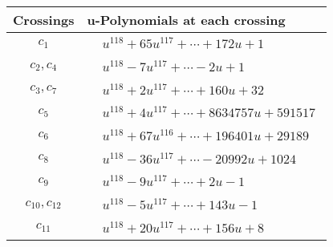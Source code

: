 \documentclass[1p]{elsarticle_modified}
\theoremstyle{definition}
\begin{document}
\begin{tabular}{m{50pt}|m{274pt}}
Crossings & \hspace{64pt}u-Polynomials at each crossing \\
\hline $$\begin{aligned}c_{1}\end{aligned}$$&$\begin{aligned}
&u^{118}+65 u^{117}+\cdots+172 u+1
\end{aligned}$\\
\hline $$\begin{aligned}c_{2},c_{4}\end{aligned}$$&$\begin{aligned}
&u^{118}-7 u^{117}+\cdots-2 u+1
\end{aligned}$\\
\hline $$\begin{aligned}c_{3},c_{7}\end{aligned}$$&$\begin{aligned}
&u^{118}+2 u^{117}+\cdots+160 u+32
\end{aligned}$\\
\hline $$\begin{aligned}c_{5}\end{aligned}$$&$\begin{aligned}
&u^{118}+4 u^{117}+\cdots+8634757 u+591517
\end{aligned}$\\
\hline $$\begin{aligned}c_{6}\end{aligned}$$&$\begin{aligned}
&u^{118}+67 u^{116}+\cdots+196401 u+29189
\end{aligned}$\\
\hline $$\begin{aligned}c_{8}\end{aligned}$$&$\begin{aligned}
&u^{118}-36 u^{117}+\cdots-20992 u+1024
\end{aligned}$\\
\hline $$\begin{aligned}c_{9}\end{aligned}$$&$\begin{aligned}
&u^{118}-9 u^{117}+\cdots+2 u-1
\end{aligned}$\\
\hline $$\begin{aligned}c_{10},c_{12}\end{aligned}$$&$\begin{aligned}
&u^{118}-5 u^{117}+\cdots+143 u-1
\end{aligned}$\\
\hline $$\begin{aligned}c_{11}\end{aligned}$$&$\begin{aligned}
&u^{118}+20 u^{117}+\cdots+156 u+8
\end{aligned}$\\
\hline
\end{tabular}\\~\\
\end{document}
